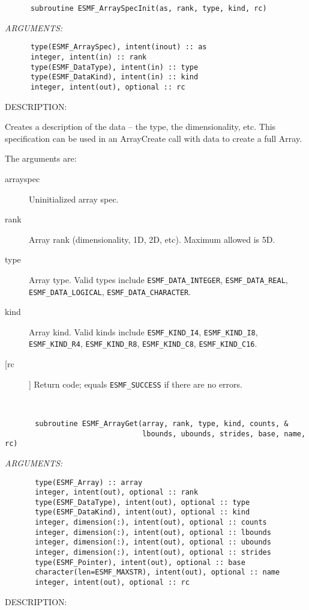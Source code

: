 \begin{verbatim}      subroutine ESMF_ArraySpecInit(as, rank, type, kind, rc)\end{verbatim}{\em ARGUMENTS:}
\begin{verbatim}      type(ESMF_ArraySpec), intent(inout) :: as
      integer, intent(in) :: rank
      type(ESMF_DataType), intent(in) :: type
      type(ESMF_DataKind), intent(in) :: kind
      integer, intent(out), optional :: rc\end{verbatim}
{\sf DESCRIPTION:\\ }


   Creates a description of the data -- the type, the dimensionality, etc.
   This specification can be
   used in an ArrayCreate call with data to create a full Array.
  
   The arguments are:
   \begin{description}
  
   \item[arrayspec]
   Uninitialized array spec.
  
   \item[rank]
   Array rank (dimensionality, 1D, 2D, etc). Maximum allowed is 5D.
  
   \item[type]
   Array type. Valid types include {\tt ESMF\_DATA\_INTEGER},
   {\tt ESMF\_DATA\_REAL}, {\tt ESMF\_DATA\_LOGICAL},
   {\tt ESMF\_DATA\_CHARACTER}.
  
   \item[kind]
   Array kind. Valid kinds include {\tt ESMF\_KIND\_I4},
   {\tt ESMF\_KIND\_I8}, {\tt ESMF\_KIND\_R4}, {\tt ESMF\_KIND\_R8},
   {\tt ESMF\_KIND\_C8}, {\tt ESMF\_KIND\_C16}.
  
   \item[[rc]]
   Return code; equals {\tt ESMF\_SUCCESS} if there are no errors.
  
   \end{description}
   
 
\mbox{}\hrulefill\ 
 

\begin{verbatim}       subroutine ESMF_ArrayGet(array, rank, type, kind, counts, &
                                lbounds, ubounds, strides, base, name, rc)\end{verbatim}{\em ARGUMENTS:}
\begin{verbatim}       type(ESMF_Array) :: array
       integer, intent(out), optional :: rank
       type(ESMF_DataType), intent(out), optional :: type
       type(ESMF_DataKind), intent(out), optional :: kind
       integer, dimension(:), intent(out), optional :: counts
       integer, dimension(:), intent(out), optional :: lbounds
       integer, dimension(:), intent(out), optional :: ubounds
       integer, dimension(:), intent(out), optional :: strides
       type(ESMF_Pointer), intent(out), optional :: base
       character(len=ESMF_MAXSTR), intent(out), optional :: name
       integer, intent(out), optional :: rc\end{verbatim}
{\sf DESCRIPTION:\\ }


